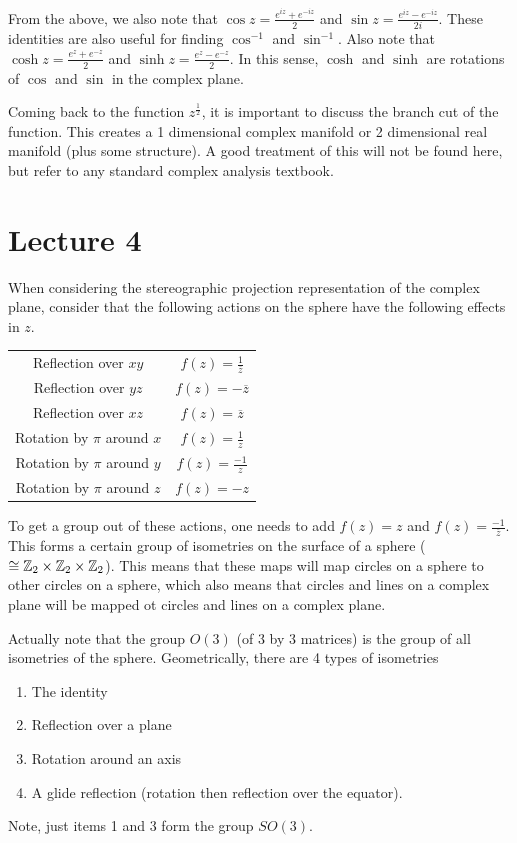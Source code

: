 \documentclass[11pt,leqno,oneside]{amsart}
\numberwithin{thm}{section}
\begin{document}
From the above, we also note that $\cos z = \frac{e^{iz}+e^{-iz}}{2}$ and $\sin
z = \frac{e^{iz}-e^{-iz}}{2i}$. These identities are also useful for finding
$\cos^{-1}$ and $\sin^{-1}$. Also note that $\cosh z = \frac{e^z+e^{-z}}{2}$
and $\sinh z = \frac{e^z-e^{-z}}{2}$. In this sense, $\cosh$ and $\sinh$ are
rotations of $\cos$ and $\sin$ in the complex plane.

Coming back to the function $z^{\frac{1}{2}}$, it is important to discuss the
branch cut of the function. This creates a 1 dimensional complex manifold or
2 dimensional real manifold (plus some structure). A good treatment of this
will not be found here, but refer to any standard complex analysis textbook.

\section{Lecture 4}
When considering the stereographic projection representation of the complex
plane, consider that the following actions on the sphere have the following
effects in $z$.

\begin{tabular}{|c|c|}
    \hline
    Reflection over $xy$ & $f(z) = \frac{1}{\overline{z}}$ \\
    Reflection over $yz$ & $f(z) = -\overline{z}$ \\
    Reflection over $xz$ & $f(z) = \overline{z}$ \\
    Rotation by $\pi$ around $x$ & $f(z) = \frac{1}{z}$ \\
    Rotation by $\pi$ around $y$ & $f(z) = \frac{-1}{z}$ \\
    Rotation by $\pi$ around $z$ & $f(z) = -z$ \\
    \hline
\end{tabular}

To get a group out of these actions, one needs to add $f(z) = z$ and $f(z) =
\frac{-1}{\overline{z}}$. This forms a certain group of isometries on the
surface of a sphere ($\cong {\mathbb Z}_2 \times {\mathbb Z}_2 \times {\mathbb Z}_2$). This means that
these maps will map circles on a sphere to other circles on a sphere, which
also means that circles and lines on a complex plane will be mapped ot circles
and lines on a complex plane.

Actually note that the group $O(3)$ (of 3 by 3 matrices) is the group of all
isometries of the sphere. Geometrically, there are 4 types of isometries
\begin{enumerate}
    \item The identity
    \item Reflection over a plane
    \item Rotation around an axis
    \item A glide reflection (rotation then reflection over the equator).
\end{enumerate}
Note, just items 1 and 3 form the group $SO(3)$.
\end{document}
